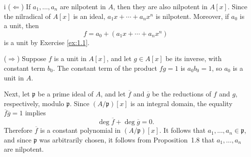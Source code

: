 \begin{partsolution}{1}{2}{i}
(\(\Leftarrow\))
If \(a_1,\ldots,a_n\) are nilpotent in \(A\), then they are also nilpotent in \(A[x]\).
Since the nilradical of \(A[x]\) is an ideal, \(a_1 x + \cdots + a_n x^n\) is nilpotent.
Moreover, if \(a_0\) is a unit, then
\begin{equation*}
f = a_0 + (a_1 x + \cdots + a_n x^n)
\end{equation*}
is a unit by Exercise \ref{ex:1.1}.

(\(\Rightarrow\))
Suppose \(f\) is a unit in \(A[x]\), and let \(g \in A[x]\) be its inverse, with constant term \(b_0\).
The constant term of the product \(f g = 1\) is \(a_0 b_0 = 1\), so \(a_0\) is a unit in \(A\).

Next, let \(\mathfrak p\) be a prime ideal of \(A\), and let \(\overline f\) and \(\overline g\) be the reductions of \(f\) and \(g\), respectively, modulo \(\mathfrak p\).
Since \((A/\mathfrak p)[x]\) is an integral domain, the equality \(\overline f \overline g = 1\) implies
\begin{equation*}
\deg \overline f + \deg \overline g = 0.
\end{equation*}
Therefore \(\overline f\) is a constant polynomial in \((A/\mathfrak p)[x]\).
It follows that \(a_1,\ldots,a_n \in \mathfrak p\), and since \(\mathfrak p\) was arbitrarily chosen, it follows from Proposition~1.8 that \(a_1,\ldots, a_n\) are nilpotent.
\end{partsolution}
